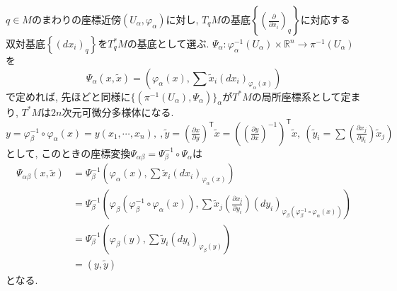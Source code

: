 \documentclass[a4paper]{ujarticle}
\numberwithin{equation}{section}
\theoremstyle{definition}
\begin{document}
        $q \in M$のまわりの座標近傍$(U_{\alpha}, \varphi_{\alpha})$に対し, 
        $T_{q} M$の基底$\displaystyle \left\{ \left(\frac{\partial}{\partial x_i}\right)_q \right\}$に対応する
        双対基底$\displaystyle \left\{ (d x_i)_q\right\}$を$T^{*}_q M$の基底として選ぶ.
        $\Psi_{\alpha}: \varphi_{\alpha}^{-1}(U_{\alpha}) \times \mathbb{R}^n \rightarrow \pi^{-1}(U_{\alpha})$を
        \[
            \Psi_{\alpha}(x, \tilde{x}) = \left(\varphi_{\alpha}(x), \sum \tilde{x}_i (d x_i)_{\varphi_{\alpha}(x)} \right)
        \]
        で定めれば, 先ほどと同様に$\{( \pi^{-1}(U_{\alpha}), \Psi_{\alpha})\}_{\alpha}$が$T^{*}M$の局所座標系として定まり,
        $T^{*}M$は$2n$次元可微分多様体になる.
        $\displaystyle y = \varphi_{\beta}^{-1} \circ \varphi_{\alpha}(x) = y(x_1, \cdots, x_n), \ , \tilde{y} = \left(\frac{\partial x}{\partial y}\right)^{\mathsf{T}} \tilde{x} = \left(\left(\frac{\partial y}{\partial x}\right)^{-1} \right)^{\mathsf{T}} \tilde{x}, \ (\tilde{y}_i = \sum \left(\frac{\partial x_j}{\partial y_i}\right) \tilde{x}_j)$として, 
        このときの座標変換$\Psi_{\alpha \beta} = \Psi_{\beta}^{-1} \circ \Psi_{\alpha}$は
        \begin{align}
            \Psi_{\alpha \beta}(x, \tilde{x}) 
            &= \Psi_{\beta}^{-1}\left(\varphi_{\alpha}(x), \sum \tilde{x}_i \left( d x_i \right)_{\varphi_{\alpha}(x)} \right)\\
            &= \Psi_{\beta}^{-1}\left(\varphi_{\beta}(\varphi_{\beta}^{-1} \circ \varphi_{\alpha}(x)), \sum \tilde{x}_j \left(\frac{\partial x_j}{\partial y_i}\right) \left( d y_i\right)_{\varphi_{\beta}(\varphi_{\beta}^{-1} \circ \varphi_{\alpha}(x))} \right)\\
            &= \Psi_{\beta}^{-1}\left(\varphi_{\beta}(y), \sum \tilde{y}_i \left(d y_i\right)_{\varphi_{\beta}(y)} \right) \\
            &= (y, \tilde{y})
        \end{align}
        となる. 
        
\end{document}
